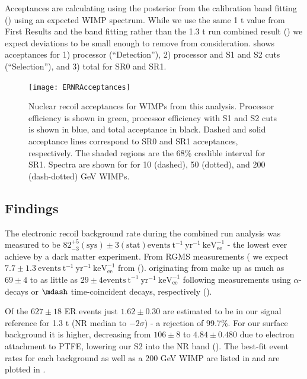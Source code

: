 Acceptances are calculating using the posterior from the calibration band fitting () using an expected
WIMP spectrum.  While we use the same 1 t value from First Results and the band fitting rather than the 1.3 t run combined
result () we expect deviations to be small enough to remove from
consideration.   shows acceptances for 1) processor (``Detection''), 2) processor and S1 and
S2 cuts (``Selection''), and 3) total for SR0 and SR1.

\begin{figure}
\centering
\texttt{[image: ERNRAcceptances]}
\caption{Nuclear recoil acceptances for WIMPs from this analysis.  Processor efficiency is shown in green, processor efficiency with S1
and S2 cuts is shown in blue, and total acceptance in black.  Dashed and solid acceptance lines correspond to SR0 and SR1 acceptances,
respectively.  The shaded regions are the 68\% credible interval for SR1.  Spectra are shown for for 10 (dashed), 50 (dotted), and
200 (dash-dotted) GeV WIMPs.}
\label{fig:dark_matter_results_acceptances}
\end{figure}



\subsection{Findings}
\label{subsec:dark_matter_results_background}
The electronic recoil background rate during the combined run analysis was measured to be
$82_{-3}^{+5} (\mathrm{sys}) \pm 3 (\mathrm{stat}) \mathrm{events\ t^{-1}\ yr^{-1}\ keV_{ee}^{-1}}$ - the lowest ever achieve by a dark
matter experiment.  From RGMS measurements ( we expect
$7.7 \pm 1.3\ \mathrm{events\ t^{-1}\ yr^{-1}\ keV_{ee}^{-1}}$ from  
().  \betadecays originating from  make up as much as $69 \pm 4$ to as
little as $29 \pm 4  \mathrm{events\ t^{-1}\ yr^{-1}\ keV_{ee}^{-1}}$ following measurements using  $\alpha$-decays or
$\mdash$ time-coincident decays, respectively ().

Of the $627 \pm 18$ ER events just $1.62 \pm 0.30$ are estimated to be in our signal reference for 1.3 t (NR median to
$-2 \sigma$) - a rejection of 99.7\%.  For our surface background it is higher, decreasing from $106 \pm 8$ to $4.84 \pm 0.480$ due to
electron attachment to PTFE, lowering our S2 into the NR band ().  The best-fit event rates
for each background as well as a 200 GeV WIMP are listed in  and are plotted in
.

